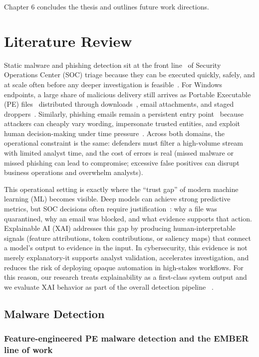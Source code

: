 \documentclass[conference]{IEEEtran}
\begin{document}
Chapter 6 concludes the thesis and outlines future work directions.

\section{Literature Review}

Static malware and phishing detection sit at the front line~\cite{KBSSSK2025} of Security Operations Center (SOC) triage because they can be executed quickly, safely, and at scale often before any deeper investigation is feasible~\cite{GPH2024}. For Windows endpoints, a large share of malicious delivery still arrives as Portable Executable (PE) files~\cite{opentext2025} distributed through downloads~\cite{recordedfuture2025malware}, email attachments, and staged droppers~\cite{secureframe2025phishing}. Similarly, phishing emails remain a persistent entry point~\cite{DBIR2025} because attackers can cheaply vary wording, impersonate trusted entities, and exploit human decision-making under time pressure~\cite{CGQ2025}. Across both domains, the operational constraint is the same: defenders must filter a high-volume stream with limited analyst time, and the cost of errors is real (missed malware or missed phishing can lead to compromise; excessive false positives can disrupt business operations and overwhelm analysts).

This operational setting is exactly where the “trust gap” of modern machine learning (ML) becomes visible. Deep models can achieve strong predictive metrics, but SOC decisions often require justification~\cite{NSDSP2025}: why a file was quarantined, why an email was blocked, and what evidence supports that action. Explainable AI (XAI) addresses this gap by producing human-interpretable signals (feature attributions, token contributions, or saliency maps) that connect a model’s output to evidence in the input. In cybersecurity, this evidence is not merely explanatory-it supports analyst validation, accelerates investigation, and reduces the risk of deploying opaque automation in high-stakes workflows. For this reason, our research treats explainability as a first-class system output and we evaluate XAI behavior as part of the overall detection pipeline~\cite{SCDVPB2017} \cite{LL2017}.

\subsection{Malware Detection}

\subsubsection{Feature-engineered PE malware detection and the EMBER line of work}
\end{document}
